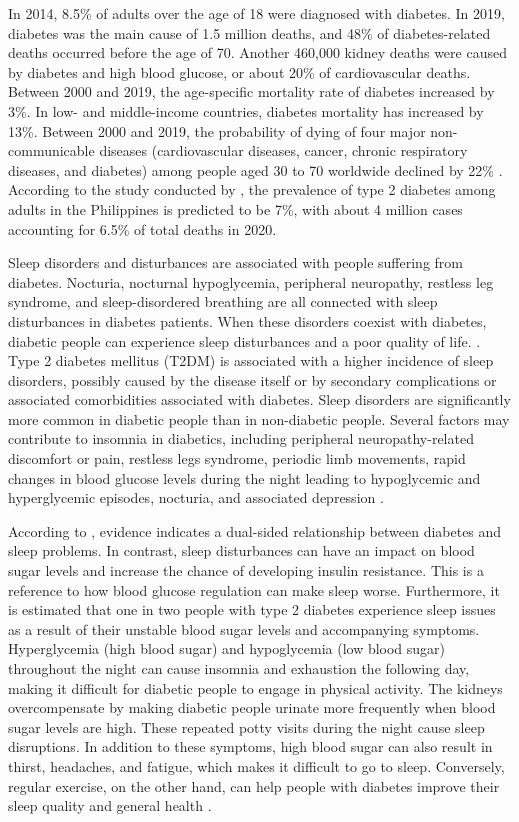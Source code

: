 In 2014, 8.5\% of adults over the age of 18 were diagnosed with diabetes. In
2019, diabetes was the main cause of 1.5 million deaths, and 48\% of
diabetes-related deaths occurred before the age of 70. Another 460,000 kidney
deaths were caused by diabetes and high blood glucose, or about 20\% of
cardiovascular deaths. Between 2000 and 2019, the age-specific mortality rate of
diabetes increased by 3\%. In low- and middle-income countries, diabetes
mortality has increased by 13\%. Between 2000 and 2019, the probability of dying
of four major non-communicable diseases (cardiovascular diseases, cancer,
chronic respiratory diseases, and diabetes) among people aged 30 to 70 worldwide
declined by 22\% \parencite{who-2023-mortality}. According to the study
conducted by \textcite{paluyo-2022}, the prevalence of type 2 diabetes
among adults in the Philippines is predicted to be 7\%, with about 4 million
cases accounting for 6.5\% of total deaths in 2020.

Sleep disorders and disturbances are associated with people suffering from
diabetes. Nocturia, nocturnal hypoglycemia, peripheral neuropathy, restless leg
syndrome, and sleep-disordered breathing are all connected with sleep
disturbances in diabetes patients. When these disorders coexist with diabetes,
diabetic people can experience sleep disturbances and a poor quality of life.
\parencite{surani-2015}. Type 2 diabetes mellitus (T2DM) is associated with a
higher incidence of sleep disorders, possibly caused by the disease itself or by
secondary complications or associated comorbidities associated with diabetes.
Sleep disorders are significantly more common in diabetic people than in
non-diabetic people. Several factors may contribute to insomnia in diabetics,
including peripheral neuropathy-related discomfort or pain, restless legs
syndrome, periodic limb movements, rapid changes in blood glucose levels during
the night leading to hypoglycemic and hyperglycemic episodes, nocturia, and
associated depression \parencite{khandelwal-2017}.

According to \textcite{morales-brown-2022}, evidence indicates a dual-sided
relationship between diabetes and sleep problems. In contrast, sleep
disturbances can have an impact on blood sugar levels and increase the chance of
developing insulin resistance. This is a reference to how blood glucose
regulation can make sleep worse. Furthermore, it is estimated that one in two
people with type 2 diabetes experience sleep issues as a result of their
unstable blood sugar levels and accompanying symptoms. Hyperglycemia (high blood
sugar) and hypoglycemia (low blood sugar) throughout the night can cause
insomnia and exhaustion the following day, making it difficult for diabetic
people to engage in physical activity. The kidneys overcompensate by making
diabetic people urinate more frequently when blood sugar levels are high. These
repeated potty visits during the night cause sleep disruptions. In addition to
these symptoms, high blood sugar can also result in thirst, headaches, and
fatigue, which makes it difficult to go to sleep. Conversely, regular exercise,
on the other hand, can help people with diabetes improve their sleep quality and
general health \parencite{pacheco-2023}.

